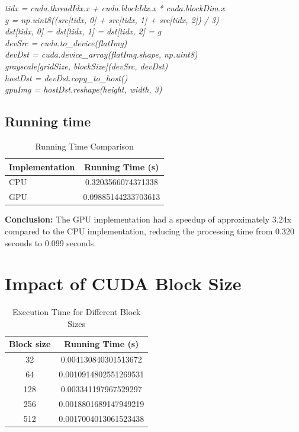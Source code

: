 \documentclass{article}
\begin{document}
\noindent\textit{tidx = cuda.threadIdx.x + cuda.blockIdx.x * cuda.blockDim.x} \\
\textit{g = np.uint8((src[tidx, 0] + src[tidx, 1] + src[tidx, 2]) / 3)} \\
\textit{dst[tidx, 0] = dst[tidx, 1] = dst[tidx, 2] = g} \\
\smallskip
\textit{devSrc = cuda.to\_device(flatImg)} \\
\textit{devDst = cuda.device\_array(flatImg.shape, np.uint8)} \\
\textit{grayscale[gridSize, blockSize](devSrc, devDst)} \\
\textit{hostDst = devDst.copy\_to\_host()} \\
\smallskip
\textit{gpuImg = hostDst.reshape(height, width, 3)}

\subsection*{Running time}

\begin{table}[H]
\centering
\renewcommand{\arraystretch}{1.5}
\begin{tabular}{|l|c|}
\hline
\textbf{Implementation} & \textbf{Running Time (s)} \\ \hline
CPU & 0.3203566074371338 \\ \hline
GPU & 0.09885144233703613 \\ \hline
\end{tabular}
\caption{Running Time Comparison}
\end{table}

\noindent \textbf{Conclusion:} The GPU implementation had a speedup of approximately 3.24x compared to the CPU implementation, reducing the processing time from 0.320 seconds to 0.099 seconds.

\section{Impact of CUDA Block Size}

\begin{table}[H]
\centering
\renewcommand{\arraystretch}{1.5}
\begin{tabular}{|c|c|}
\hline
\textbf{Block size} & \textbf{Running Time (s)} \\ \hline
32 & 0.004130840301513672 \\ \hline
64 & 0.0010914802551269531 \\ \hline
128 & 0.003341197967529297 \\ \hline
256 & 0.0018801689147949219 \\ \hline
512 & 0.0017004013061523438 \\ \hline
\end{tabular}
\caption{Execution Time for Different Block Sizes}
\end{table}
\end{document}
